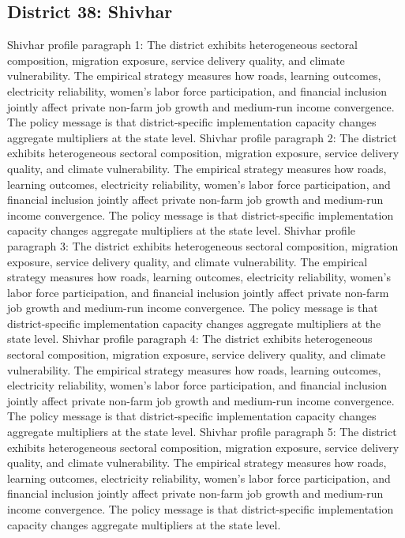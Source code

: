 \documentclass[preprint,12pt]{elsarticle}
\begin{document}
\subsection{District 38: Shivhar}
Shivhar profile paragraph 1: The district exhibits heterogeneous sectoral composition, migration exposure, service delivery quality, and climate vulnerability. The empirical strategy measures how roads, learning outcomes, electricity reliability, women's labor force participation, and financial inclusion jointly affect private non-farm job growth and medium-run income convergence. The policy message is that district-specific implementation capacity changes aggregate multipliers at the state level.
Shivhar profile paragraph 2: The district exhibits heterogeneous sectoral composition, migration exposure, service delivery quality, and climate vulnerability. The empirical strategy measures how roads, learning outcomes, electricity reliability, women's labor force participation, and financial inclusion jointly affect private non-farm job growth and medium-run income convergence. The policy message is that district-specific implementation capacity changes aggregate multipliers at the state level.
Shivhar profile paragraph 3: The district exhibits heterogeneous sectoral composition, migration exposure, service delivery quality, and climate vulnerability. The empirical strategy measures how roads, learning outcomes, electricity reliability, women's labor force participation, and financial inclusion jointly affect private non-farm job growth and medium-run income convergence. The policy message is that district-specific implementation capacity changes aggregate multipliers at the state level.
Shivhar profile paragraph 4: The district exhibits heterogeneous sectoral composition, migration exposure, service delivery quality, and climate vulnerability. The empirical strategy measures how roads, learning outcomes, electricity reliability, women's labor force participation, and financial inclusion jointly affect private non-farm job growth and medium-run income convergence. The policy message is that district-specific implementation capacity changes aggregate multipliers at the state level.
Shivhar profile paragraph 5: The district exhibits heterogeneous sectoral composition, migration exposure, service delivery quality, and climate vulnerability. The empirical strategy measures how roads, learning outcomes, electricity reliability, women's labor force participation, and financial inclusion jointly affect private non-farm job growth and medium-run income convergence. The policy message is that district-specific implementation capacity changes aggregate multipliers at the state level.
\end{document}
